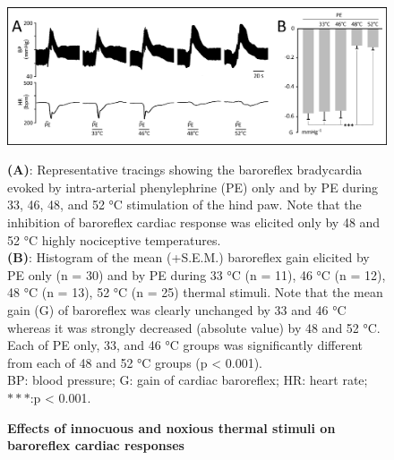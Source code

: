 \documentclass[a4paper,12pt,twoside]{report}
\begin{document}
\cleardoublepage



\cleardoublepage

\begin{figure}[p]

\begin{center}
 \includegraphics[scale=1]{Article2-FIG1.jpg} 
\end{center}

\caption{\textbf{Effects of innocuous and noxious thermal stimuli on baroreflex cardiac responses}}

{\protect\parbox[t]{18cm}{
\begin{small}
\textbf{(A)}: Representative tracings showing the baroreflex bradycardia evoked by intra-arterial phenylephrine (PE) only and by PE during 33, 46, 48, and 52 °C stimulation of the hind paw. Note that the inhibition of baroreflex cardiac response was elicited only by 48 and 52 °C highly nociceptive temperatures.\\
\textbf{(B)}: Histogram of the mean (+S.E.M.) baroreflex gain elicited by PE only (n = 30) and by PE during 33 °C (n = 11), 46 °C (n = 12), 48 °C (n = 13), 52 °C (n = 25) thermal stimuli. Note that the mean gain (G) of baroreflex was clearly unchanged by 33 and 46 °C whereas it was strongly decreased (absolute value) by 48 and 52 °C. Each of PE only, 33, and 46 °C groups was significantly different from each of 48 and 52 °C groups (p < 0.001).\\
BP: blood pressure; G: gain of cardiac baroreflex; HR: heart rate; $***$:p < 0.001.
\end{small}}}

\label{Article2-FIG1}

\end{figure}
\end{document}
